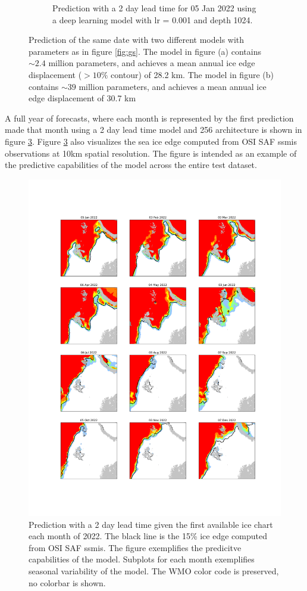\documentclass[../main/thesis]{subfiles}
\begin{document}
\begin{figure}
\begin{subfigure}{0.49\textwidth}
        \caption{Prediction with a 2 day lead time for 05 Jan 2022 using a deep learning model with lr = 0.001 and depth 1024.}
        \label{fig:gs_middle_right}
    \end{subfigure}
    \caption{Prediction of the same date with two different models with parameters as in figure \ref{fig:gs}. The model in figure (a) contains $\sim 2.4$ million parameters, and achieves a mean annual ice edge displacement ($>10\%$ contour) of 28.2 km. The model in figure (b) contains $\sim 39$ million parameters, and achieves a mean annual ice edge displacement of 30.7 km}
    \label{fig:256_1024_compare}
\end{figure}

A full year of forecasts, where each month is represented by the first prediction made that month using a 2 day lead time model and 256 architecture is shown in figure \ref{fig:timeseries}. Figure \ref{fig:timeseries} also visualizes the sea ice edge computed from OSI SAF ssmis observations at 10km spatial resolution. The figure is intended as an example of the predictive capabilities of the model across the entire test dataset. 

\begin{figure}
    \centering
    \includegraphics[width=.86\textwidth]{Forecast_time_series}
    \caption{\label{fig:timeseries}Prediction with a 2 day lead time given the first available ice chart each month of 2022. The black line is the 15\% ice edge computed from OSI SAF ssmis. The figure exemplifies the predicitve capabilities of the model. Subplots for each month exemplifies seasonal variability of the model. The WMO color code is preserved, no colorbar is shown.}
\end{figure}
\end{document}
